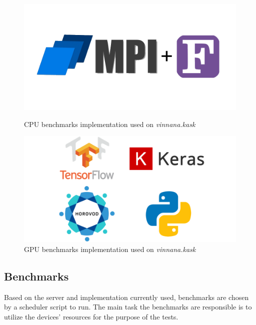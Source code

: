 \begin{figure}[hbt!]
    \centering
    \captionsetup{width=.46\linewidth}
    \begin{minipage}[t]{0.46\textwidth}
        \includegraphics[width=\textwidth]{figures/implementations/MPI-Fortran_logo.png}
        \caption{CPU benchmarks implementation used on \emph{vinnana.kask}}\label{fig:cpus_implementation_vinnana.kask}
    \end{minipage}
    \hspace{1cm}
    \centering
    \captionsetup{width=.46\linewidth}
    \begin{minipage}[t]{0.46\textwidth}
        \includegraphics[width=\textwidth]{figures/implementations/Horovod-Python_logo.png}
        \caption{GPU benchmarks implementation used on \emph{vinnana.kask}}\label{fig:gpus_implementation_vinnana.kask}
    \end{minipage}
\end{figure}



\newpage

\subsection{Benchmarks}
Based on the server and implementation currently used, benchmarks are chosen
by a scheduler script to run. The main task the benchmarks are responsible is
to utilize the devices' resources for the purpose of the tests.

